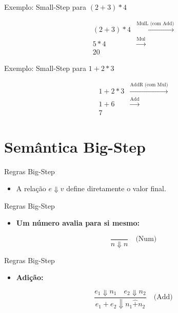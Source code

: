 \begin{frame}{Exemplo: Small-Step para \((2 + 3) * 4\)}

    \[\begin{array}{ll}
    (2 + 3) * 4 & \xrightarrow{\text{MulL (com Add)}} \\
    5 * 4       & \xrightarrow{\text{Mul}} \\
    20          &
\end{array}\]
\end{frame}

\begin{frame}{Exemplo: Small-Step para \(1 + 2 * 3\)}

    \[\begin{array}{ll}
    1 + 2 * 3 & \xrightarrow{\text{AddR (com Mul)}} \\
    1 + 6     & \xrightarrow{\text{Add}} \\
    7         &
\end{array}\]
\end{frame}


\section{Semântica Big-Step}\label{semuxe2ntica-big-step}

\begin{frame}{Regras Big-Step}

    \begin{itemize}

        \item
        A relação \(e \Downarrow v\) define diretamente o valor final.
    \end{itemize}
\end{frame}

\begin{frame}{Regras Big-Step}

    \begin{itemize}

        \item
        \textbf{Um número avalia para si mesmo:}
    \end{itemize}

    \[\frac{}{n \Downarrow n} \quad \text{(Num)}\]
\end{frame}

\begin{frame}{Regras Big-Step}

    \begin{itemize}

        \item
        \textbf{Adição:}
    \end{itemize}

    \[\frac{e_1 \Downarrow n_1 \quad e_2 \Downarrow n_2}{e_1 + e_2 \Downarrow n_1 \mathbin{\hat{+}} n_2} \quad \text{(Add)}\]
\end{frame}

